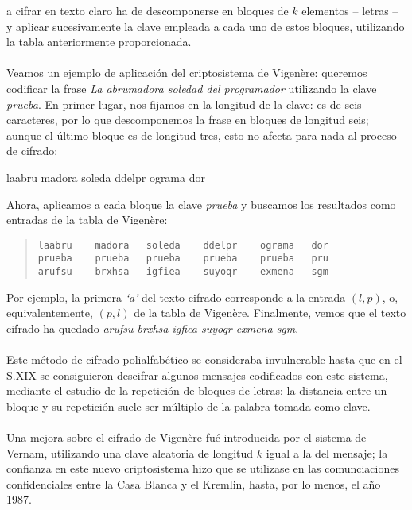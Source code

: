 a cifrar en texto claro ha de descomponerse en bloques de $k$ elementos --
letras --
y aplicar sucesivamente la clave empleada a cada uno de estos bloques,
utilizando la tabla anteriormente proporcionada.\\
\\Veamos un ejemplo de aplicaci\'on del criptosistema de Vigen\`ere:
queremos codificar la frase {\it La abrumadora soledad del programador}
utilizando la clave {\it prueba}. En primer lugar, nos fijamos en la longitud
de la clave: es de seis caracteres, por lo que descomponemos la frase
en bloques de longitud seis; aunque el \'ultimo bloque es de longitud tres,
esto no afecta para nada al proceso de cifrado:
\tt
\begin{center}
laabru    madora   soleda    ddelpr    ograma   dor
\end{center}
\rm
Ahora, aplicamos a cada bloque la clave {\it prueba} y buscamos los resultados
como entradas de la tabla de Vigen\`ere:
\begin{quote}
\begin{verbatim}
laabru    madora   soleda    ddelpr    ograma   dor
prueba    prueba   prueba    prueba    prueba   pru
arufsu    brxhsa   igfiea    suyoqr    exmena   sgm
\end{verbatim}
\end{quote}
Por ejemplo, la primera {\it `a'} del texto cifrado corresponde a la entrada
$(l,p)$, o, equivalentemente, $(p,l)$ de la tabla de Vigen\`ere.
Finalmente, vemos que el texto cifrado ha quedado {\it arufsu brxhsa igfiea
suyoqr exmena sgm}.\\
\\Este m\'etodo de cifrado polialfab\'etico se consideraba
invulnerable hasta que en el S.XIX se consiguieron descifrar algunos mensajes
codificados con este sistema, mediante el estudio de la repetici\'on
de bloques de letras: la distancia entre un bloque y su repetici\'on
suele ser m\'ultiplo de la palabra tomada como clave.\\
\\Una mejora sobre el cifrado de Vigen\`ere fu\'e introducida
por el sistema de Vernam, utilizando una clave aleatoria de longitud $k$
igual a la del mensaje; la confianza en este nuevo criptosistema hizo que
se utilizase en las comunciaciones confidenciales entre la Casa Blanca
y el Kremlin, hasta, por lo menos, el a\~no 1987.
